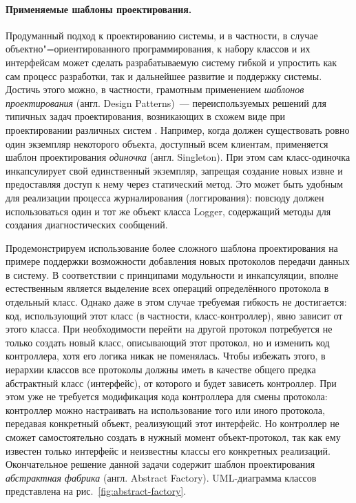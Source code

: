\documentclass[a4paper, 14pt, titlepage]{extarticle}
\newcommand{\eng}[1]{\foreignlanguage{english}{#1}}
\newcommand{\term}[1]{\emph{#1}}
\let\oldparagraph\paragraph
\renewcommand{\paragraph}[1]{\oldparagraph{\indent #1}}
\begin{document}
  \paragraph{Применяемые шаблоны проектирования.}
  Продуманный подход к проектированию системы, и в частности, в случае объектно"=ориентированного
  программирования, к набору классов и их интерфейсам может сделать разрабатываемую систему гибкой и
  упростить как сам процесс разработки, так и дальнейшее развитие и поддержку системы. Достичь этого
  можно, в частности, грамотным применением \term{шаблонов проектирования} (англ. \eng{Design
  Patterns})~--- переиспользуемых решений для типичных задач проектирования, возникающих в схожем
  виде при проектировании различных систем \cite{gamma-patterns}. Например, когда должен
  существовать ровно один экземпляр некоторого объекта, доступный всем клиентам, применяется шаблон
  проектирования \term{одиночка} (англ. \eng{Singleton}). При этом сам класс-одиночка инкапсулирует
  свой единственный экземпляр, запрещая создание новых извне и предоставляя доступ к нему через
  статический метод. Это может быть удобным для реализации процесса журналирования (логгирования):
  повсюду должен использоваться один и тот же объект класса \eng{Logger}, содержащий методы для
  создания диагностических сообщений.

  Продемонстрируем использование более сложного шаблона проектирования на примере поддержки
  возможности добавления новых протоколов передачи данных в систему.
  В соответствии с принципами модульности и инкапсуляции, вполне естественным является выделение всех
  операций определённого протокола в отдельный класс. Однако даже в этом случае требуемая гибкость
  не достигается: код, использующий этот класс (в частности, класс-контроллер), явно зависит от
  этого класса. При необходимости перейти на другой протокол потребуется не только создать новый
  класс, описывающий этот протокол, но и изменить код контроллера, хотя его логика никак не
  поменялась. Чтобы избежать этого, в иерархии классов все протоколы должны иметь в качестве общего
  предка абстрактный класс (интерфейс), от которого и будет зависеть контроллер. При этом уже не
  требуется модификация кода контроллера для смены протокола: контроллер можно настраивать на
  использование того или иного протокола, передавая конкретный объект, реализующий этот интерфейс.
  Но контроллер не сможет самостоятельно создать в нужный момент объект-протокол, так как ему
  известен только интерфейс и неизвестны классы его конкретных реализаций.
  Окончательное решение данной задачи содержит шаблон проектирования \term{абстрактная фабрика}
  (англ. \eng{Abstract Factory}). UML-диаграмма классов представлена на рис.~\ref{fig:abstract-factory}.
\end{document}
